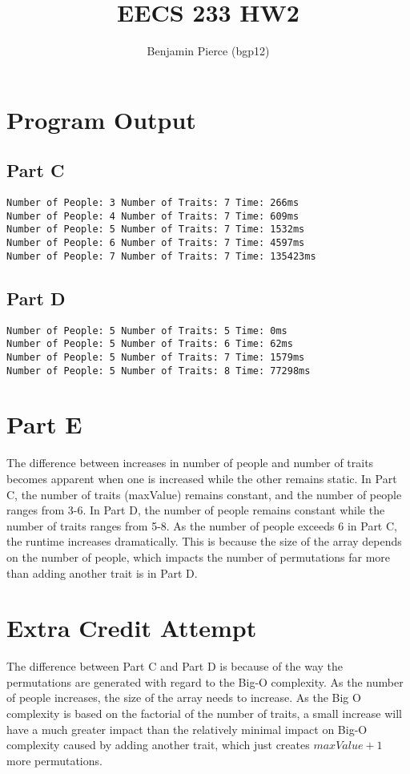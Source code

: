 \documentclass[12pt]{article} %
\title{EECS 233 HW2}
\author{Benjamin Pierce (bgp12)}
\begin{document}
\maketitle

\section{Program Output}
\subsection{Part C}
\begin{lstlisting}
Number of People: 3 Number of Traits: 7 Time: 266ms
Number of People: 4 Number of Traits: 7 Time: 609ms
Number of People: 5 Number of Traits: 7 Time: 1532ms
Number of People: 6 Number of Traits: 7 Time: 4597ms
Number of People: 7 Number of Traits: 7 Time: 135423ms
\end{lstlisting}

\subsection{Part D}
\begin{lstlisting}
Number of People: 5 Number of Traits: 5 Time: 0ms
Number of People: 5 Number of Traits: 6 Time: 62ms
Number of People: 5 Number of Traits: 7 Time: 1579ms
Number of People: 5 Number of Traits: 8 Time: 77298ms
\end{lstlisting}

\section{Part E}
The difference between increases in number of people and number of traits becomes apparent when one is increased while the other remains static. In Part C, the number of traits (maxValue) remains constant, and the number of people ranges from 3-6. In Part D, the number of people remains constant while the number of traits ranges from 5-8. As the number of people exceeds 6 in Part C, the runtime increases dramatically. This is because the size of the array depends on the number of people, which impacts the number of permutations far more than adding another trait is in Part D.

\section{Extra Credit Attempt}
The difference between Part C and Part D is because of the way the permutations are generated with regard to the Big-O complexity. As the number of people increases, the size of the array needs to increase. As the Big O complexity is based on the factorial of the number of traits, a small increase will have a much greater impact than the relatively minimal impact on Big-O complexity caused by adding another trait, which just creates $maxValue +1$ more permutations.
\end{document}

